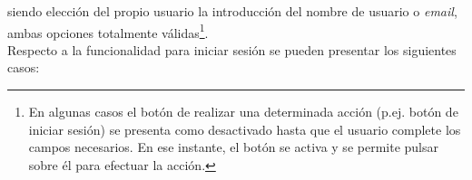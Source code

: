 \documentclass[12pt,a4paper, twoside]{report}
\begin{document}
	siendo elección del propio usuario la introducción del nombre de usuario o \textit{email}, ambas opciones totalmente válidas\footnote{En algunas casos el botón de realizar una determinada acción (p.ej. botón de iniciar sesión) se presenta como desactivado hasta que el usuario complete los campos necesarios. En ese instante, el botón se activa y se permite pulsar sobre él para efectuar la acción.}. \\
		
	
	Respecto a la funcionalidad para iniciar sesión se pueden presentar los siguientes casos:
	
\end{document}
